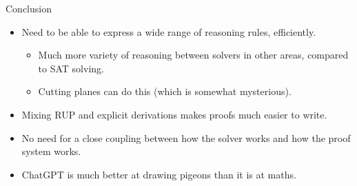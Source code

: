 \documentclass[aspectratio=169,compress,10pt]{beamer}
\begin{document}
\begin{frame}{Conclusion}
    \begin{minipage}[t]{0.7\paperwidth}
\begin{itemize}
    \item Need to be able to express a wide range of reasoning rules, efficiently.
        \begin{itemize}
            \item Much more variety of reasoning between solvers in other areas, compared to SAT
                solving.
            \item Cutting planes can do this (which is somewhat mysterious).
        \end{itemize}
    \item Mixing RUP and explicit derivations makes proofs much easier to write.
    \item No need for a close coupling between how the solver works and how the proof system
        works.
    \item <2-> ChatGPT is much better at drawing pigeons than it is at maths.
\end{itemize}%
\end{minipage}%
\end{frame}
\end{document}
